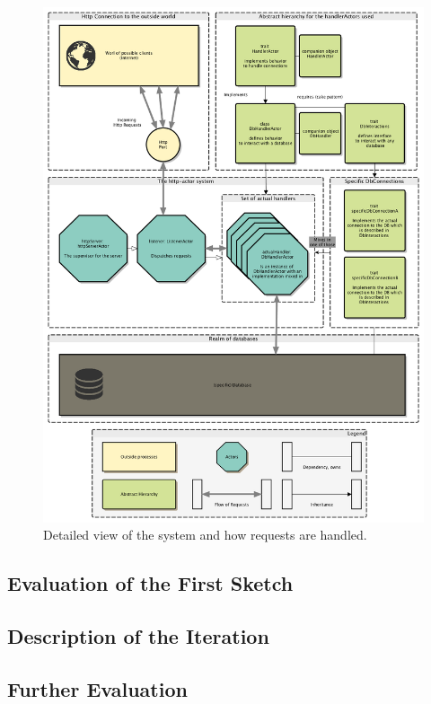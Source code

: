 \documentclass[twoside, 11pt]{scrartcl}
\begin{document}
\begin{figure}[h!]		
 	\includegraphics[scale=0.35]{figures/requestFlow.png}
	\caption{Detailed view of the system and how requests are handled. }
	\label{fig:requestFlow}
\end{figure}

\subsection{Evaluation of the First Sketch}
\subsection{Description of the Iteration}
\subsection{Further Evaluation}
\end{document}
